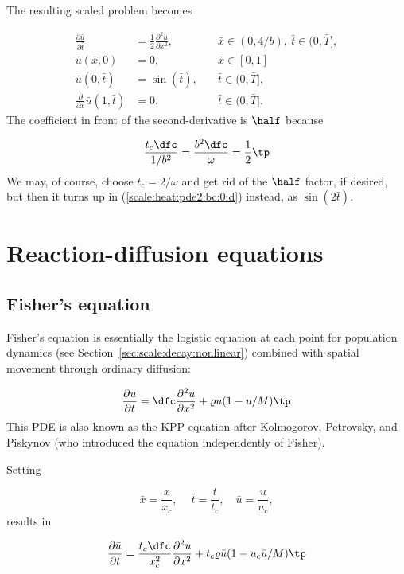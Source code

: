 \documentclass[graybox,envcountchap,sectrefs,final]{svmonodo}
\begin{document}
The resulting scaled problem becomes

\begin{align}
\frac{\partial \bar u}{\partial \bar t} &=
\frac{1}{2}\frac{\partial^2 u}{\partial x^2},
\quad & \bar x\in (0,4/b),\ \bar t\in (0,\bar T],
\label{scale:heat:pde2:d}\\ 
\bar u(\bar x,0) &= 0,
\quad &\bar x\in [0,1]
\label{scale:heat:pde2:ic:u:d}\\ 
\bar u(0,\bar t) & = \sin(\bar t),
\quad  &\bar t\in (0,\bar T],
\label{scale:heat:pde2:bc:0:d}\\ 
\frac{\partial}{\partial\bar x}\bar u(1,\bar t) & = 0,
\quad &\bar t\in (0,\bar T].
\label{scale:heat:pde2:bc:L:d}
\end{align}
The coefficient in front of the second-derivative is $\half$ because

\[ \frac{t_c\dfc}{1/b^2} = \frac{b^2\dfc}{\omega}
= \frac{1}{2}\tp\]
We may, of course, choose $t_c=2/\omega$ and get rid of the $\half$ factor,
if desired, but then it turns up in (\ref{scale:heat:pde2:bc:0:d}) instead,
as $\sin (2\bar t)$.



\section{Reaction-diffusion equations}
\label{sec:scale:diffu:Fisher}

\subsection{Fisher's equation}

Fisher's equation is essentially the logistic equation at each point
for population dynamics (see Section~\ref{sec:scale:decay:nonlinear})
combined with spatial movement through ordinary diffusion:

\begin{equation}
\frac{\partial u}{\partial t} =
\dfc\frac{\partial^2 u}{\partial x^2} + \varrho u(1-u/M)
\tp
\label{sec:scale:diffu:Fisher:pde}
\end{equation}
This PDE is also known as the KPP equation after
Kolmogorov, Petrovsky, and Piskynov (who introduced the equation
independently of Fisher).

Setting

\[ \bar x = \frac{x}{x_c},\quad
\ \bar t = \frac{t}{t_c}, \quad\bar u =\frac{u}{u_c},\]
results in

\[
\frac{\partial \bar u}{\partial \bar t} =
\frac{t_c\dfc}{x_c^2}
\frac{\partial^2 u}{\partial x^2} + t_c \varrho \bar u (1 - u_c\bar u/M)\tp
\]
\end{document}
